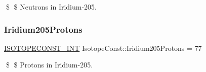 \$ \$ Neutrons in Iridium-\/205. \mbox{\label{group___isotope_const-_iridium-_ir205_gaef97438e7a4e62b74a390ecd9a533666}} 
\subsubsection{\texorpdfstring{Iridium205\+Protons}{Iridium205Protons}}
{\footnotesize\ttfamily \mbox{\hyperlink{group___isotope_const-_macros_ga5f18360b3e99483a35c32d789e62621c}{I\+S\+O\+T\+O\+P\+E\+C\+O\+N\+S\+T\+\_\+\+I\+NT}} Isotope\+Const\+::\+Iridium205\+Protons = 77}

\$ \$ Protons in Iridium-\/205. 
